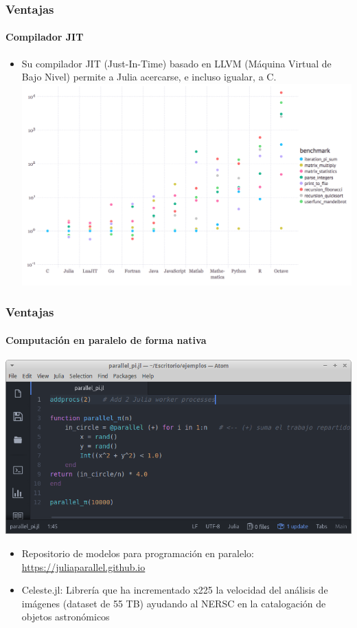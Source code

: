 \documentclass{beamer}
\begin{document}
\begin{frame}
\frametitle{Ventajas}
\framesubtitle{Compilador JIT}
\begin{itemize}
	\item Su compilador JIT (Just-In-Time) basado en LLVM (Máquina Virtual de Bajo Nivel) permite a Julia acercarse, e incluso igualar, a C.\\
	\includegraphics[scale=0.35]{images/benchmarking-julia}
\end{itemize}
\end{frame}

\begin{frame}
\frametitle{Ventajas}
\framesubtitle{Computación en paralelo de forma nativa}
\includegraphics[scale=0.37]{images/julia-pararell-pi}
\begin{itemize}
	\item Repositorio de modelos para programación en paralelo: \url{https://juliaparallel.github.io}
	\item Celeste.jl\footnotemark: Librería que ha incrementado x225 la velocidad del análisis de imágenes (dataset de 55 TB) ayudando al NERSC en la catalogación de objetos astronómicos
\end{itemize}
\end{frame}
\end{document}
